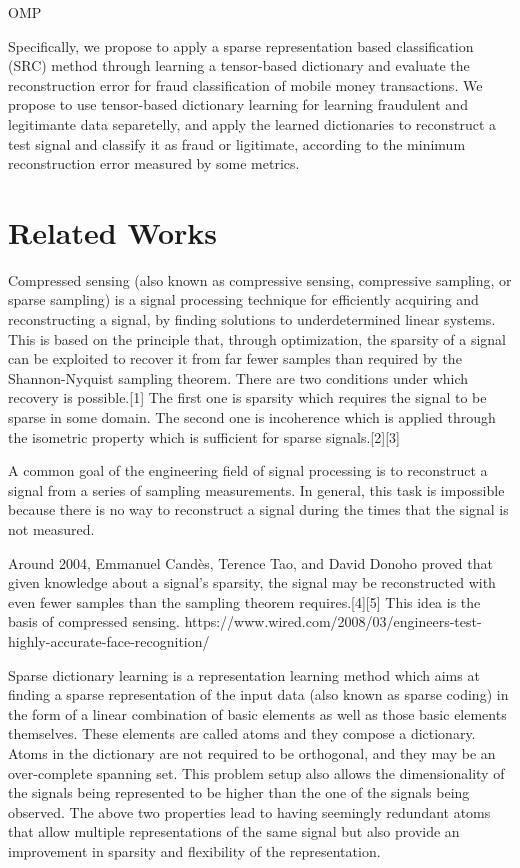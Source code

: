 OMP \cite{davis1997adaptive}

Specifically, we propose to apply a sparse representation based classification (SRC) method through learning a tensor-based dictionary and evaluate the reconstruction error for fraud classification of mobile money transactions. We propose to use tensor-based dictionary learning for learning fraudulent and legitimante data separetelly, and apply the learned dictionaries to reconstruct a test signal and classify it as fraud or ligitimate, according to the minimum reconstruction error measured by some metrics.


\section{Related Works}
\label{sec:4_relatedworks}

Compressed sensing (also known as compressive sensing, compressive sampling, or sparse sampling) is a signal processing technique for efficiently acquiring and reconstructing a signal, by finding solutions to underdetermined linear systems. This is based on the principle that, through optimization, the sparsity of a signal can be exploited to recover it from far fewer samples than required by the Shannon-Nyquist sampling theorem. There are two conditions under which recovery is possible.[1] The first one is sparsity which requires the signal to be sparse in some domain. The second one is incoherence which is applied through the isometric property which is sufficient for sparse signals.[2][3]

A common goal of the engineering field of signal processing is to reconstruct a signal from a series of sampling measurements. In general, this task is impossible because there is no way to reconstruct a signal during the times that the signal is not measured.

Around 2004, Emmanuel Candès, Terence Tao, and David Donoho proved that given knowledge about a signal's sparsity, the signal may be reconstructed with even fewer samples than the sampling theorem requires.[4][5] This idea is the basis of compressed sensing. 	https://www.wired.com/2008/03/engineers-test-highly-accurate-face-recognition/

Sparse dictionary learning is a representation learning method which aims at finding a sparse representation of the input data (also known as sparse coding) in the form of a linear combination of basic elements as well as those basic elements themselves. These elements are called atoms and they compose a dictionary. Atoms in the dictionary are not required to be orthogonal, and they may be an over-complete spanning set. This problem setup also allows the dimensionality of the signals being represented to be higher than the one of the signals being observed. The above two properties lead to having seemingly redundant atoms that allow multiple representations of the same signal but also provide an improvement in sparsity and flexibility of the representation.

